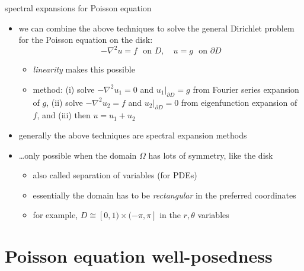 \documentclass[10pt,
               svgnames,
               hyperref={colorlinks,
                         citecolor=DeepPink4,
                         linkcolor=FireBrick,
                         urlcolor=blue},
               usepdftitle=false]{beamer}
\newcommand{\grad}{\nabla}
\begin{document}
\begin{frame}{spectral expansions for Poisson equation}

\begin{itemize}
\item we can combine the above techniques to solve the general Dirichlet problem for the Poisson equation on the disk:
   	$$-\grad^2 u = f\,\,\text{ on } D, \quad u=g \,\,\text{ on } \partial D$$

   \begin{itemize}
   \item[$\circ$] \emph{linearity} makes this possible   
   \item[$\circ$] method: (i) solve $-\grad^2 u_1 = 0$ and $u_1|_{\partial D}=g$ from Fourier series expansion of $g$, (ii) solve $-\grad^2 u_2 = f$ and $u_2|_{\partial D}=0$ from eigenfunction expansion of $f$, and (iii) then $u=u_1+u_2$
   \end{itemize}
\item generally the above techniques are \alert{spectral expansion methods}
\item \dots only possible when the domain $\Omega$ has lots of symmetry, like the disk
   \begin{itemize}
   \item[$\circ$] also called \alert{separation of variables} (for PDEs)
   \item[$\circ$] essentially the domain has to be \emph{rectangular} in the preferred coordinates
   \item[$\circ$] for example, $D \cong [0,1) \times (-\pi,\pi]$ in the $r,\theta$ variables
   \end{itemize}
\end{itemize}
\end{frame}


\section{Poisson equation well-posedness}
\end{document}
